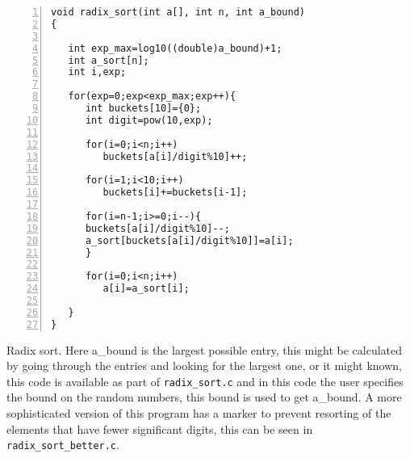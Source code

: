 \documentclass[11pt,a4paper]{scrartcl}
\begin{document}
\begin{table}
\begin{lstlisting}[numbers=left]
void radix_sort(int a[], int n, int a_bound)
{

   int exp_max=log10((double)a_bound)+1;
   int a_sort[n];
   int i,exp;

   for(exp=0;exp<exp_max;exp++){
      int buckets[10]={0};
      int digit=pow(10,exp);

      for(i=0;i<n;i++)
         buckets[a[i]/digit%10]++;

      for(i=1;i<10;i++)
         buckets[i]+=buckets[i-1];

      for(i=n-1;i>=0;i--){
	  buckets[a[i]/digit%10]--;
	  a_sort[buckets[a[i]/digit%10]]=a[i];
      }

      for(i=0;i<n;i++)
         a[i]=a_sort[i];

   }
}
\end{lstlisting}
\caption{Radix sort. Here a\_bound is the largest possible entry, this
  might be calculated by going through the entries and looking for the
  largest one, or it might known, this code is available as part of
  {\tt radix\_sort.c} and in this code the user specifies the bound on
  the random numbers, this bound is used to get a\_bound. A more
  sophisticated version of this program has a marker to prevent
  resorting of the elements that have fewer significant digits, this
  can be seen in {\tt radix\_sort\_better.c}.\label{c_radix}}
\end{table}
\end{document}

